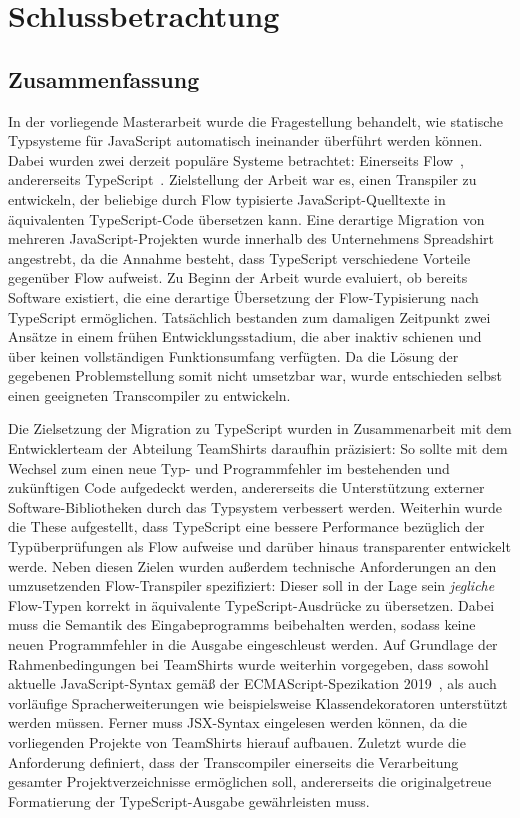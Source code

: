 \chapter{Schlussbetrachtung}
\label{chap:conclusion}

\section{Zusammenfassung}

In der vorliegende Masterarbeit wurde die Fragestellung behandelt, wie statische Typsysteme für JavaScript automatisch ineinander überführt werden können. Dabei wurden zwei derzeit populäre Systeme betrachtet: Einerseits Flow~\autocite{FLOW:PAPER}, andererseits TypeScript~\autocite{TYPESCRIPT:SPEC}. Zielstellung der Arbeit war es, einen Transpiler zu entwickeln, der beliebige durch Flow typisierte JavaScript-Quelltexte in äquivalenten TypeScript-Code übersetzen kann. Eine derartige Migration von mehreren JavaScript-Projekten wurde innerhalb des Unternehmens Spreadshirt angestrebt, da die Annahme besteht, dass TypeScript verschiedene Vorteile gegenüber Flow aufweist. Zu Beginn der Arbeit wurde evaluiert, ob bereits Software existiert, die eine derartige Übersetzung der Flow-Typisierung nach TypeScript ermöglichen. Tatsächlich bestanden zum damaligen Zeitpunkt zwei Ansätze in einem frühen Entwicklungsstadium, die aber inaktiv schienen und über keinen vollständigen Funktionsumfang verfügten. Da die Lösung der gegebenen Problemstellung somit nicht umsetzbar war, wurde entschieden selbst einen geeigneten Transcompiler zu entwickeln.

Die Zielsetzung der Migration zu TypeScript wurden in Zusammenarbeit mit dem Entwicklerteam der Abteilung TeamShirts daraufhin präzisiert: So sollte mit dem Wechsel zum einen neue Typ- und Programmfehler im bestehenden und zukünftigen Code aufgedeckt werden, andererseits die Unterstützung externer Software-Bibliotheken durch das Typsystem verbessert werden. Weiterhin wurde die These aufgestellt, dass TypeScript eine bessere Performance bezüglich der Typüberprüfungen als Flow aufweise und darüber hinaus transparenter entwickelt werde. Neben diesen Zielen wurden außerdem technische Anforderungen an den umzusetzenden Flow-Transpiler spezifiziert: Dieser soll in der Lage sein \emph{jegliche} Flow-Typen korrekt in äquivalente TypeScript-Ausdrücke zu übersetzen. Dabei muss die Semantik des Eingabeprogramms beibehalten werden, sodass keine neuen Programmfehler in die Ausgabe eingeschleust werden. Auf Grundlage der Rahmenbedingungen bei TeamShirts wurde weiterhin vorgegeben, dass sowohl aktuelle JavaScript-Syntax gemäß der ECMAScript-Spezikation 2019~\autocite{ECMASCRIPT:2019}, als auch vorläufige Spracherweiterungen wie beispielsweise Klassendekoratoren unterstützt werden müssen. Ferner muss JSX-Syntax eingelesen werden können, da die vorliegenden Projekte von TeamShirts hierauf aufbauen. Zuletzt wurde die Anforderung definiert, dass der Transcompiler einerseits die Verarbeitung gesamter Projektverzeichnisse ermöglichen soll, andererseits die originalgetreue Formatierung der TypeScript-Ausgabe gewährleisten muss.

